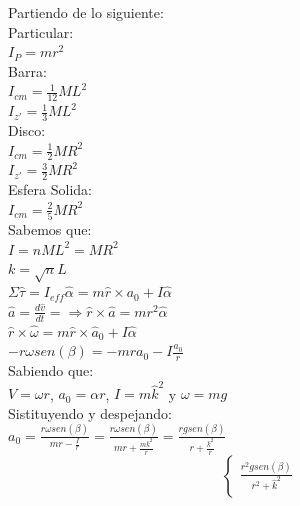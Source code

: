 \documentclass[a4paper,11pt]{scrartcl}
\begin{document}
\begin{center}

Partiendo de lo siguiente:\\
\hfill \break
Particular:\\
$I_P = mr^2$\\
\hfill \break
Barra:\\
$I_{cm} = \frac{1}{12} ML^2$\\
\hfill \break
$I_{z'} = \frac{1}{3} ML^2$\\
\hfill \break
Disco:\\
$I_{cm} = \frac{1}{2} MR^2$\\
\hfill \break
$I_{z'} = \frac{3}{2} MR^2$\\
\hfill \break
Esfera Solida:\\
$I_{cm} = \frac{2}{5} MR^2$\\
\hfill \break
Sabemos que:\\
\hfill \break
$I = n M L^2 = M R^2$\\
\hfill \break
$k = \sqrt{n} L$\\
\hfill \break
$\Sigma \hat{\tau} = I_{eff} \hat{\alpha} = m \hat{r} \times a_0 + I \hat{\alpha}$\\
\hfill \break
$\hat{a} = \frac{d \hat{v}}{d t} = \Rightarrow \hat{r}\times \hat{a} = m r^2 \hat{\alpha}$\\
\hfill \break
$\hat{r} \times \hat{\omega} = m \hat{r} \times \hat{a}_0 + I \hat{\alpha}$\\
\hfill \break
$-r\omega sen(\beta) = - m r a_0 - I \frac{a_0}{r}$\\
\hfill \break
Sabiendo que:\\
\hfill \break
$V = \omega r$, $a_0 = \alpha r$, $I = m \hat{k}^2$ y $\omega = m g$\\
\hfill \break
Sistituyendo y despejando:\\
\hfill \break
$a_0 = \frac{r \omega sen(\beta)}{mr - \frac{I}{r}} = \frac{r \omega sen(\beta)}{mr + \frac{m \hat{k}^2}{r}} = \frac{r g sen(\beta)}{r + \frac{\hat{k}^2}{r}}$\\
\hfill \break
\begin{equation*}
  \left\lbrace
  \begin{array}{l}
   \frac{r^2 g sen(\beta)}{r^2 + \hat{k}^2}
  \end{array}
  \right.
\end{equation*}

\end{center}
\end{document}
